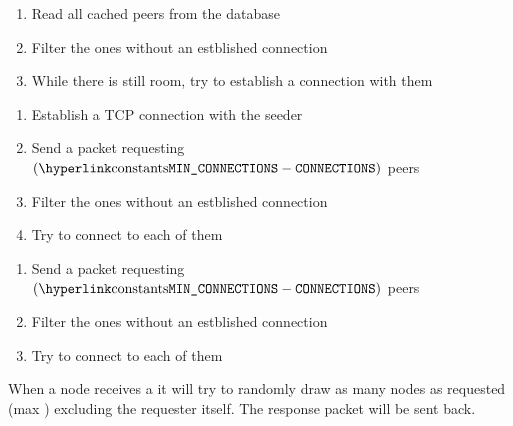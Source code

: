 \documentclass[../documentation.tex]{subfiles}
\begin{document}
\begin{center}
\end{center}

\begin{enumerate}
    \item Read all cached peers from the database
    \item Filter the ones without an estblished connection
    \item While there is still room, try to establish a connection with them
\end{enumerate}

\begin{enumerate}
    \item Establish a TCP connection with the seeder
    \item Send a  packet requesting
        \((\text{\const{MIN\_CONNECTIONS}} - \text{\texttt{CONNECTIONS}})\) peers
    \item Filter the ones without an estblished connection
    \item Try to connect to each of them
\end{enumerate}

\begin{enumerate}
    \item Send a  packet requesting
        \((\text{\const{MIN\_CONNECTIONS}} - \text{\texttt{CONNECTIONS}})\) peers
    \item Filter the ones without an estblished connection
    \item Try to connect to each of them
\end{enumerate}

When a node receives a 
it will try to randomly draw as many nodes as requested (max
) excluding the requester itself.
The  response packet will be sent back.
\end{document}
